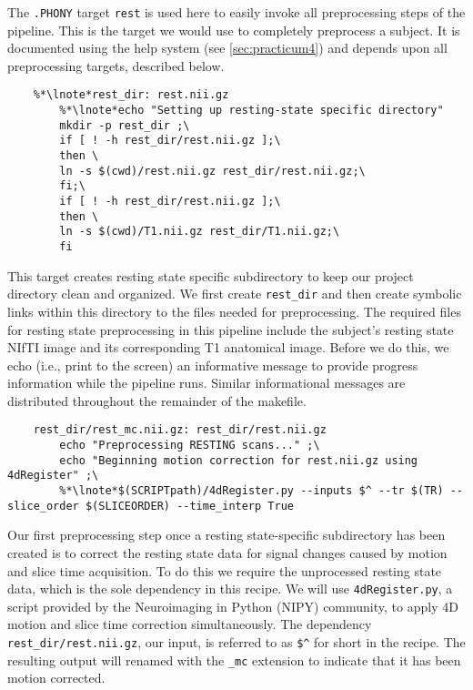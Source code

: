 
The \texttt{.PHONY} target \texttt{rest} is used here to easily invoke all preprocessing steps of the pipeline. This is the target we would use to completely preprocess a subject. It is documented using the help system (see \autoref{sec:practicum4}) and depends upon all preprocessing targets, described below.

\begin{lstlisting}
	%*\lnote*rest_dir: rest.nii.gz 
		%*\lnote*echo "Setting up resting-state specific directory" 
		mkdir -p rest_dir ;\
		if [ ! -h rest_dir/rest.nii.gz ];\
		then \
		ln -s $(cwd)/rest.nii.gz rest_dir/rest.nii.gz;\
		fi;\
		if [ ! -h rest_dir/rest.nii.gz ];\
		then \
		ln -s $(cwd)/T1.nii.gz rest_dir/T1.nii.gz;\
		fi
\end{lstlisting}

\lnum{4} This target creates resting state specific subdirectory to keep our project directory clean and organized. We first create \texttt{rest_dir} and then create symbolic links within this directory to the files needed for preprocessing. The required files for resting state preprocessing in this pipeline include the subject's resting state NIfTI image and its corresponding T1 anatomical image.   Before we do this, we echo (i.e., print to the screen) an informative message to provide progress information while the pipeline runs. Similar informational messages are distributed throughout the remainder of the makefile.

\begin{lstlisting}
	rest_dir/rest_mc.nii.gz: rest_dir/rest.nii.gz
		echo "Preprocessing RESTING scans..." ;\
		echo "Beginning motion correction for rest.nii.gz using 4dRegister" ;\
		%*\lnote*$(SCRIPTpath)/4dRegister.py --inputs $^ --tr $(TR) --slice_order $(SLICEORDER) --time_interp True

\end{lstlisting}

Our first preprocessing step once a resting state-specific subdirectory has been created is to correct the resting state data for signal changes caused by motion and slice time acquisition. To do this we require the unprocessed resting state data, which is the sole dependency in this recipe.  \lnum{6} We will use \texttt{4dRegister.py}, a script provided by the Neuroimaging in Python (NIPY) community, to apply 4D motion and slice time correction simultaneously. The dependency \texttt{rest_dir/rest.nii.gz}, our input, is referred to as \texttt{\$\^} for short in the recipe. The resulting output will renamed with the  \texttt{_mc} extension to indicate that it has been motion corrected.

